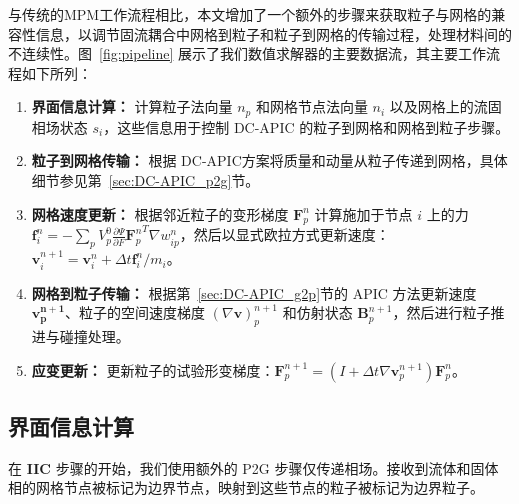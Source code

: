 与传统的MPM工作流程相比，本文增加了一个额外的步骤来获取粒子与网格的兼容性信息，以调节固流耦合中网格到粒子和粒子到网格的传输过程，处理材料间的不连续性。图~\ref{fig:pipeline} 展示了我们数值求解器的主要数据流，其主要工作流程如下所列：

\begin{enumerate}
\item[1.] \textbf{界面信息计算：} 计算粒子法向量 $n_p$ 和网格节点法向量 $n_i$ 以及网格上的流固相场状态 $s_i$，这些信息用于控制 DC-APIC 的粒子到网格和网格到粒子步骤。
\item[2.] \textbf{粒子到网格传输：} 根据 DC-APIC方案将质量和动量从粒子传递到网格，具体细节参见第~\ref{sec:DC-APIC_p2g}节。
\item[3.] \textbf{网格速度更新：}
根据邻近粒子的变形梯度 $\mathbf{F}_p^n$ 计算施加于节点 $i$ 上的力 $\mathbf{f}_i^n=-\sum_p V_p^0 \frac{\partial \Psi}{\partial F} {\mathbf{F}_p^n}^T \nabla w_{ip}^n$，然后以显式欧拉方式更新速度：$\mathbf{v}_i^{n+1}=\mathbf{v}_i^n + \Delta t \mathbf{f}_i^n / m_i$。
\item[4.] \textbf{网格到粒子传输：}
根据第~\ref{sec:DC-APIC_g2p}节的 APIC 方法更新速度 $\mathbf{v_p^{n+1}}$、粒子的空间速度梯度 $(\nabla \mathbf{v})_p^{n+1}$ 和仿射状态 $\mathbf{B}_p^{n+1}$，然后进行粒子推进与碰撞处理。
\item[5.] \textbf{应变更新：}
更新粒子的试验形变梯度：$\mathbf{F}_p^{n+1} = (I + \Delta t \nabla \mathbf{v}_p^{n+1}) \mathbf{F}_p^n$。

\end{enumerate}



\subsection{界面信息计算}
\label{interface_information_calculation}
在 \textbf{IIC} 步骤的开始，我们使用额外的 P2G 步骤仅传递相场。接收到流体和固体相的网格节点被标记为边界节点，映射到这些节点的粒子被标记为边界粒子。

